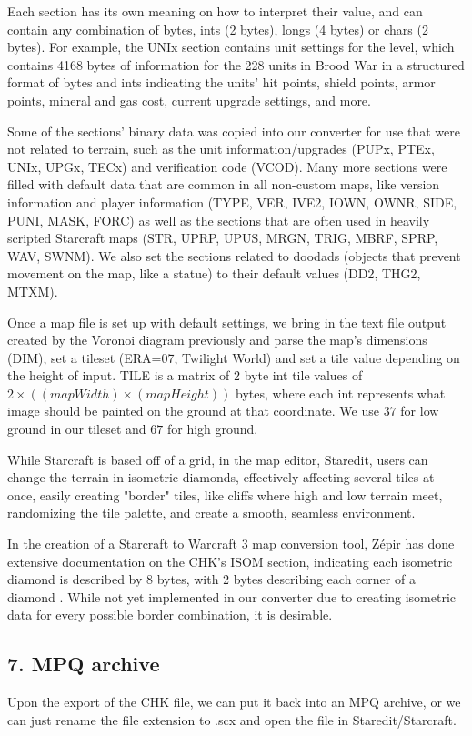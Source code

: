 \documentclass[letterpaper]{article}
\begin{document}
Each section has its own meaning on how to interpret their value, and can contain any combination of bytes, ints (2 bytes), longs (4 bytes) or chars (2 bytes). For example, the UNIx section contains unit settings for the level, which contains 4168 bytes of information for the 228 units in Brood War in a structured format of bytes and ints indicating the units' hit points, shield points, armor points, mineral and gas cost, current upgrade settings, and more.

Some of the sections' binary data was copied into our converter for use that were not related to terrain, such as the unit information/upgrades (PUPx, PTEx, UNIx, UPGx, TECx) and verification code (VCOD). Many more sections were filled with default data that are common in all non-custom maps, like version information and player information (TYPE, VER, IVE2, IOWN, OWNR, SIDE, PUNI, MASK, FORC) as well as the sections that are often used in heavily scripted Starcraft maps (STR, UPRP, UPUS, MRGN, TRIG, MBRF, SPRP, WAV, SWNM). We also set the sections related to doodads (objects that prevent movement on the map, like a statue) to their default values (DD2, THG2, MTXM).

Once a map file is set up with default settings, we bring in the text file output created by the Voronoi diagram previously and parse the map's dimensions (DIM), set a tileset (ERA=07, Twilight World) and set a tile value depending on the height of input. TILE is a matrix of 2 byte int tile values of $2 \times ((mapWidth)  \times (mapHeight))$ bytes, where each int represents what image should be painted on the ground at that coordinate. We use $37$ for low ground in our tileset and $67$ for high ground.

While Starcraft is based off of a grid, in the map editor, Staredit, users can change the terrain in isometric diamonds, effectively affecting several tiles at once, easily creating "border" tiles, like cliffs where high and low terrain meet, randomizing the tile palette, and create a smooth, seamless environment.

In the creation of a Starcraft to Warcraft 3 map conversion tool, Zépir has done extensive documentation on the CHK's ISOM section, indicating each isometric diamond is described by 8 bytes, with 2 bytes describing each corner of a diamond \cite{Zépir}. While not yet implemented in our converter due to creating isometric data for every possible border combination, it is desirable.


\subsection{7. MPQ archive}
Upon the export of the CHK file, we can put it back into an MPQ archive, or we can just rename the file extension to .scx and open the file in Staredit/Starcraft.
\end{document}
